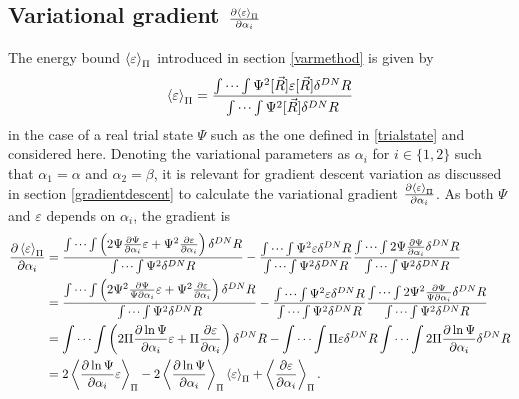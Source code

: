\documentclass[a4paper,8pt]{article}
\begin{document}
\subsection{Variational gradient $\frac{\partial\ev{\varepsilon}_\Pi}{\partial\alpha_i}$} \label{derVargrad}
The energy bound $\ev{\varepsilon}_\Pi$ introduced in section \ref{varmethod} is given by
\begin{equation}
\ev{\varepsilon}_\Pi = \frac{\idotsint \Psi^2[\vec{R}] \varepsilon[\vec{R}] \delta^{DN}R}{\idotsint \Psi^2[\vec{R}]\delta^{DN}R} \label{energybound}
\end{equation}
in the case of a real trial state $\Psi$ such as the one defined in \eqref{trialstate} and considered here. Denoting the variational parameters as $\alpha_i$ for $i \in \{1,2\}$ such that $\alpha_1 = \alpha$ and $\alpha_2 = \beta$, it is relevant for gradient descent variation as discussed in section \ref{gradientdescent} to calculate the variational gradient $\frac{\partial \ev{\varepsilon}_\Pi}{\partial \alpha_i}$. As both $\Psi$ and $\varepsilon$ depends on $\alpha_i$, the gradient is
\begin{align}
\frac{\partial\ev{\varepsilon}_\Pi}{\partial\alpha_i} &= \frac{\idotsint \left(2\Psi\frac{\partial\Psi}{\partial\alpha_i}\varepsilon+\Psi^2\frac{\partial\varepsilon}{\partial\alpha_i}\right)\delta^{DN}R}{\idotsint \Psi^2 \delta^{DN}R} - \frac{\idotsint \Psi^2\varepsilon \delta^{DN}R}{\idotsint \Psi^2 \delta^{DN}R}\frac{\idotsint 2\Psi\frac{\partial\Psi}{\partial\alpha_i}\delta^{DN}R}{\idotsint \Psi^2 \delta^{DN}R} \nonumber\\
&= \frac{\idotsint \left(2\Psi^2\frac{\partial\Psi}{\Psi\partial\alpha_i}\varepsilon+\Psi^2\frac{\partial\varepsilon}{\partial\alpha_i}\right)\delta^{DN}R}{\idotsint \Psi^2 \delta^{DN}R} - \frac{\idotsint \Psi^2\varepsilon \delta^{DN}R}{\idotsint \Psi^2 \delta^{DN}R}\frac{\idotsint 2\Psi^2\frac{\partial\Psi}{\Psi\partial\alpha_i}\delta^{DN}R}{\idotsint \Psi^2 \delta^{DN}R} \nonumber\\
&= \idotsint \left(2\Pi\frac{\partial\ln\Psi}{\partial\alpha_i}\varepsilon+\Pi\frac{\partial\varepsilon}{\partial\alpha_i}\right)\delta^{DN}R - \idotsint \Pi\varepsilon \delta^{DN}R \idotsint 2\Pi\frac{\partial\ln\Psi}{\partial\alpha_i} \delta^{DN}R \nonumber\\
&= 2\ev{\frac{\partial\ln\Psi}{\partial\alpha_i}\varepsilon}_\Pi-2\ev{\frac{\partial\ln\Psi}{\partial\alpha_i}}_\Pi\ev{\varepsilon}_\Pi+\ev{\frac{\partial\varepsilon}{\partial\alpha_i}}_\Pi. 
\end{align}
\end{document}
